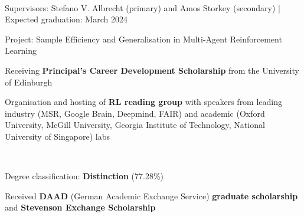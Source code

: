\documentclass[]{lukas-cv-openfont}
\begin{document}


\vspace{1em}


\noindent
{}
\\
\begin{tightitemize}{1.7em}
    \item Supervisors: Stefano V. Albrecht (primary) and Amos Storkey (secondary) | Expected graduation: March 2024
    \item Project: Sample Efficiency and Generalisation in Multi-Agent Reinforcement Learning
    \item Receiving \textbf{Principal's Career Development Scholarship} from the University of Edinburgh
    \item Organisation and hosting of \textbf{RL reading group} with speakers from leading industry (MSR, Google Brain, Deepmind, FAIR) and academic (Oxford University, McGill University, Georgia Institute of Technology, National University of Singapore) labs
\end{tightitemize}
\largesectionsep

\noindent
{}
\\
\begin{tightitemize}{1.7em}
    \item Degree classification: \textbf{Distinction} (77.28\%)
    \item Received \textbf{DAAD} (German Academic Exchange Service) \textbf{graduate scholarship} and \textbf{Stevenson Exchange Scholarship} 
\end{tightitemize}
\largesectionsep
\end{document}
